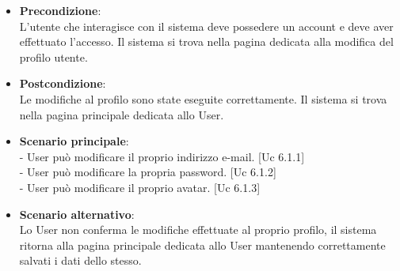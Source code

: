 {\begin{itemize}
\item \textbf{Precondizione}:\\
L'utente che interagisce con il sistema deve possedere un account e deve aver effettuato l'accesso. Il sistema si trova nella pagina dedicata alla modifica del profilo utente.

\item \textbf{Postcondizione}:\\
Le modifiche al profilo sono state eseguite correttamente. Il sistema si trova nella pagina principale dedicata allo User.

\item \textbf{Scenario principale}:\\
- User può modificare il proprio indirizzo e-mail. [Uc 6.1.1]\\
- User può modificare la propria password. [Uc 6.1.2]\\
- User può modificare il proprio avatar. [Uc 6.1.3]

\item \textbf{Scenario alternativo}:\\
Lo User non conferma le modifiche effettuate al proprio profilo, il sistema ritorna alla pagina principale dedicata allo User mantenendo correttamente salvati i dati dello stesso.

\end{itemize}




\newpage
{}}
